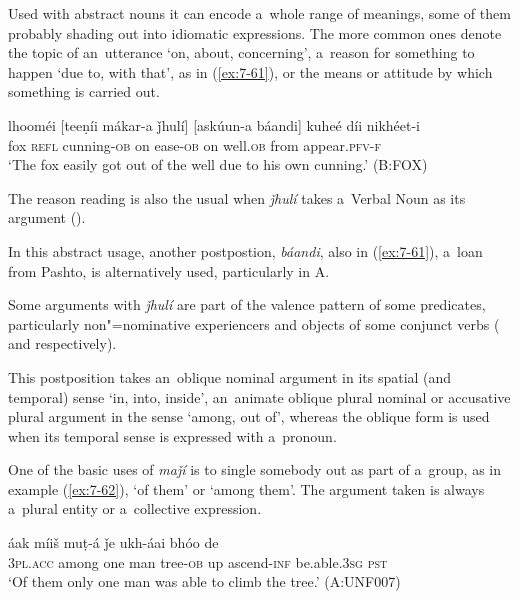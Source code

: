 Used with abstract nouns it can encode a~whole range of meanings, some of them probably shading out into idiomatic expressions. The more common ones denote the topic of an~utterance `on, about, concerning', a~reason for something to happen `due to, with that', as in (\ref{ex:7-61}), or the means or attitude by which something is carried out.

\begin{exe}
\ex
\label{ex:7-61}
\gll lhooméi [teeṇíi mákar-a ǰhulí] [askúun-a báandi] kuheé díi nikhéet-i \\
fox \textsc{refl} cunning-\textsc{ob} on ease-\textsc{ob}  on well.\textsc{ob} from appear.\textsc{pfv-f} \\
\glt `The fox easily got out of the well due to his own cunning.' (B:FOX)
\end{exe}

The reason reading is also the usual when \textit{ǰhulí} takes a~Verbal Noun as its argument ().


In this abstract usage, another postpostion, \textit{báandi}, also in (\ref{ex:7-61}), a~loan from Pashto, is alternatively used, particularly in A.


Some arguments with \textit{ǰhulí} are part of the valence pattern of some predicates, particularly non"=nominative experiencers and objects of some conjunct verbs ( and  respectively).


 This postposition takes an~oblique nominal argument in its spatial (and temporal) sense `in, into, inside', an~animate oblique plural nominal or accusative plural argument in the sense `among, out of', whereas the oblique form is used when its temporal sense is expressed with a~pronoun. 


One of the basic uses of \textit{maǰí} is to single somebody out as part of a~group, as in example (\ref{ex:7-62}), `of them' or `among them'. The argument taken is always a~plural entity or a~collective expression.

\begin{exe}
\ex
\label{ex:7-62}
 áak míiš muṭ-á ǰe ukh-áai bhóo de \\
\textsc{3pl.acc} among one man tree-\textsc{ob} up ascend-\textsc{inf}  be.able.\textsc{3sg} \textsc{pst} \\
\glt `Of them only one man was able to climb the tree.' (A:UNF007)
\end{exe}

